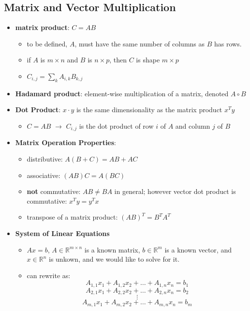 \subsection{Matrix and Vector Multiplication}
\begin{itemize}
    \item \textbf{matrix product}: $C = AB$
    \begin{itemize}
        \item to be defined, $A$, must have the same number of columns as $B$ has rows.
        \item if $A$ is $m \times n$ and $B$ is $n \times p$, then $C$ is shape $m \times p$
        \item $C_{i,j} = \sum_k A_{i,k} B_{k,j}$
    \end{itemize}
    \item \textbf{Hadamard product}: element-wise multiplication of a matrix, denoted $A \circ B$
    \item \textbf{Dot Product}: $x \cdot y$ is the same dimensionality as the matrix product $x^T y$
    \begin{itemize}
        \item $C = AB$ $\rightarrow$ $C_{i,j}$ is the dot product of row $i$ of $A$ and column $j$ of $B$ 
    \end{itemize}
    \item \textbf{Matrix Operation Properties}:
    \begin{itemize}
        \item distributive: $A(B + C) = AB + AC$
        \item associative: $(AB)C = A(BC)$
        \item \textbf{not} commutative: $AB \neq BA$ in general; however vector dot product is commutative: $x^T y = y^T x$
        \item transpose of a matrix product: $(AB)^T = B^T A^T$
    \end{itemize}
    \item \textbf{System of Linear Equations}
    \begin{itemize}
        \item $Ax=b$, $A \in \mathbb{R}^{m \times n}$ is a known matrix, $b \in \mathbb{R}^m$ is a known vector, and $x \in \mathbb{R}^n$ is unkown, and we would like to solve for it.
        \item can rewrite as: $$A_{1,1}x_1 + A_{1,2}x_2 + \dots + A_{1, n}x_n = b_1$$
        $$A_{2,1}x_1 + A_{2,2}x_2 + \dots + A_{2, n}x_n = b_2$$ 
        $$\vdots$$
        $$A_{m,1}x_1 + A_{m,2}x_2 + \dots + A_{m, n}x_n = b_m$$
    \end{itemize}
\end{itemize}

